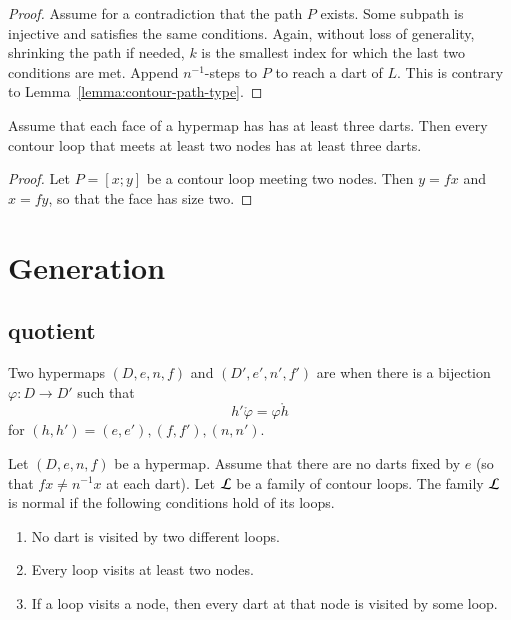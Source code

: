 
\begin{proof} Assume for a contradiction that the path $P$ exists.
Some subpath is injective and satisfies the same conditions.  Again,
without loss of generality, shrinking the path if needed, $k$ is the
smallest index for which the last two conditions are met.  Append
$n^{-1}$-steps to $P$ to reach a dart of $L$.  This is contrary to
Lemma~\ref{lemma:contour-path-type}.
\end{proof}

\begin{lemma}\label{lemma:3dart}  
Assume that each face of a hypermap has has at least three darts.
Then every contour loop that meets at least two nodes has at least
three darts.
\end{lemma}

\begin{proof} Let $P=[x;y]$ be a contour loop meeting two nodes.  Then
$y = f x$ and $x = f y$, so that the face has size two.
\end{proof}

\section{Generation}
%

\subsection{quotient}
%

\begin{definition}[isomorphic] Two hypermaps $(D,e,n,f)$ and
$(D',e',n',f')$ are  when there is a bijection
$\varphi:D\to D'$ such that
\begin{displaymath}h'\ocirc \varphi = \varphi\ocirc h\end{displaymath}
for $(h,h')=(e,e'), (f,f'), (n,n')$.
%
%
\end{definition}


\begin{definition}
Let $(D,e,n,f)$ be a hypermap. Assume that 
there are no darts fixed by $e$ 
(so that $f x \ne n^{-1} x$ at each dart). 
Let $\cal L$ be a family of contour
loops.  The family $\cal L$ is  normal if the following
conditions hold of its loops. \begin{enumerate}
\item No dart is visited by two different loops.
\item Every loop visits at least two nodes.
\item If a loop visits a node, then every dart at that node is visited
by some loop.
\end{enumerate}
%
\end{definition}

